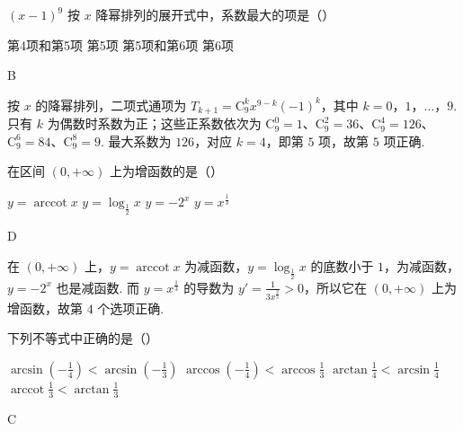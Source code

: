 \documentclass[UTF8,a4paper,oneside,11pt]{ctexbook}
\begin{document}
\begin{problem}
\((x - 1)^{9}\) 按 \(x\) 降幂排列的展开式中，系数最大的项是（\quad）

\choices
    {第4项和第5项}
    {第5项}
    {第5项和第6项}
    {第6项}
\end{problem}

\begin{answer}
B
\end{answer}

\begin{solution}
按 \(x\) 的降幂排列，二项式通项为
\(T_{k+1}=\mathrm C_9^k x^{9-k}(-1)^k\)，其中 \(k=0\)，\(1\)，\(\ldots\)，\(9\). 只有 \(k\) 为偶数时系数为正；这些正系数依次为
\(\mathrm C_9^0=1\)、\(\mathrm C_9^2=36\)、\(\mathrm C_9^4=126\)、\(\mathrm C_9^6=84\)、\(\mathrm C_9^8=9\). 最大系数为 \(126\)，对应 \(k=4\)，即第 \(5\) 项，故第 \(5\) 项正确.
\end{solution}

\begin{problem}
在区间 \((0, +\infty)\) 上为增函数的是（\quad）

\choices
    {\(y = \operatorname{arccot} x\)}
    {\(y = \log_{\frac{1}{2}} x\)}
    {\(y = -2^{x}\)}
    {\(y = x^{\frac{1}{3}}\)}
\end{problem}

\begin{answer}
D
\end{answer}

\begin{solution}
在 \((0,+\infty)\) 上，\(y=\operatorname{arccot}x\) 为减函数，\(y=\log_{\frac12}x\) 的底数小于 \(1\)，为减函数，\(y=-2^x\) 也是减函数. 而
\(y=x^{\frac13}\) 的导数为 \(y'=\frac{1}{3x^{\frac23}}>0\)，所以它在 \((0,+\infty)\) 上为增函数，故第 \(4\) 个选项正确.
\end{solution}

\begin{problem}
下列不等式中正确的是（\quad）

\choices
    {\(\arcsin \left(-\frac{1}{4}\right) < \arcsin \left(-\frac{1}{3}\right)\)}
    {\(\arccos \left(-\frac{1}{4}\right) < \arccos \frac{1}{3}\)}
    {\(\arctan \frac{1}{4} < \arcsin \frac{1}{4}\)}
    {\(\operatorname{arccot} \frac{1}{3} < \arctan \frac{1}{3}\)}
\end{problem}

\begin{answer}
C
\end{answer}
\end{document}
